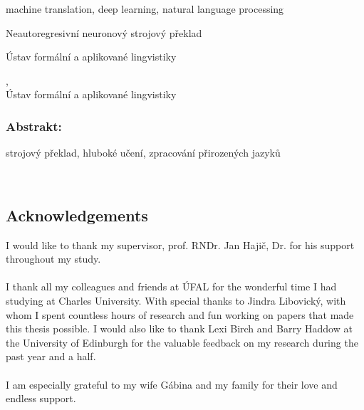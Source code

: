 \documentclass[12pt,notitlepage,a4paper,openright]{report}
\begin{document}


\begin{description}[leftmargin=7.5em,labelwidth=7em,labelindent=0em,labelsep=0.5em]
\item[Keywords:] machine translation, deep learning, natural language processing
\end{description}


\cleardoublepage{}
\begin{description}[leftmargin=7.5em,labelwidth=7em,labelindent=0em,labelsep=0.5em]
\item[Název práce:] Neautoregresivní neuronový strojový překlad
\item[Autor:] \theauthor{}
\item[Katedra:] Ústav formální a aplikované lingvistiky
\item[Vedoucí práce:] \thesupervisor,\\ Ústav formální a aplikované lingvistiky
\end{description}

\subsubsection{Abstrakt:}



\begin{description}[leftmargin=7.5em,labelwidth=7em,labelindent=0em,labelsep=0.5em]
%
\item[Klíčová slova:] strojový překlad, hluboké učení, zpracování přirozených jazyků
%
\end{description}





\cleardoublepage{}
\ \vspace{10mm}

\subsection*{Acknowledgements}

{ I would like to thank my supervisor, prof. RNDr. Jan Hajič, Dr. for his
  support throughout my study. \\
  \\
  I thank all my colleagues and friends at ÚFAL for the wonderful time I had
  studying at Charles University. With special thanks to Jindra Libovický, with
  whom I spent countless hours of research and fun working on papers that made
  this thesis possible. I would also like to thank Lexi Birch and Barry Haddow
  at the University of Edinburgh for the valuable feedback on my research
  during the past year and a half.
  \\
  \\
  I am especially grateful to my wife Gábina and my family for their love and
  endless support. }
\end{document}
